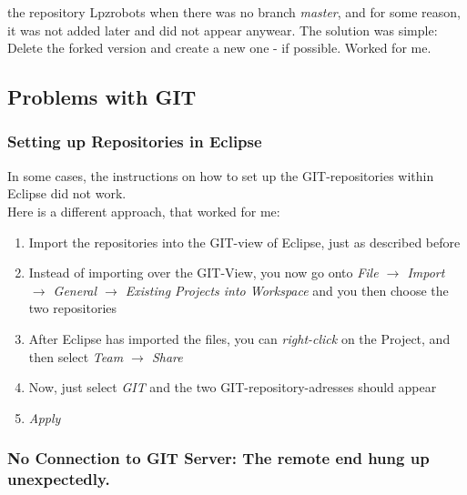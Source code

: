 the repository Lpzrobots when there was no branch \emph{master}, and for some reason, it was not added later and did not appear anywear.
The solution was simple: Delete the forked version and create a new one - if possible. Worked for me.

\subsection{Problems with GIT}

\subsubsection{Setting up Repositories in Eclipse}
\label{EclipseGIT}
In some cases, the instructions on how to set up the GIT-repositories within Eclipse did not work. \\
Here is a different approach, that worked for me: \\
\begin{enumerate}
 \item Import the repositories into the GIT-view of Eclipse, just as described before
 \item Instead of importing over the GIT-View, you now go onto \emph{File $\rightarrow$ Import $\rightarrow$ General $\rightarrow$ Existing Projects into Workspace} and you then choose the two repositories
 \item After Eclipse has imported the files, you can \emph{right-click} on the Project, and then select \emph{Team $\rightarrow$ Share}
 \item Now, just select \emph{GIT} and the two GIT-repository-adresses should appear
 \item \emph{Apply}
\end{enumerate}


\subsubsection{No Connection to GIT Server: The remote end hung up unexpectedly.}

